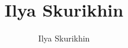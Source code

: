 \documentclass[12pt,a4paper]{res}
\author{Ilya Skurikhin}
\title{Ilya Skurikhin}
\begin{document}
\
\end{document}
